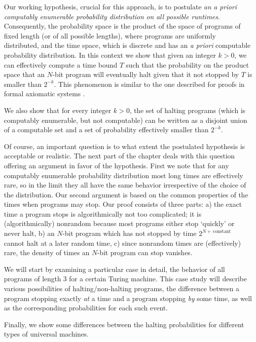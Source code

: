 \documentclass[12pt,twoside,openright]{report}
\begin{document}
Our working hypothesis, crucial for this approach, is to postulate {\it an a priori computably enumerable probability distribution on all possible runtimes}. Consequently, the probability space is the product of the space of programs of fixed length (or of all possible lengths), where programs are uniformly distributed, and the time space, which is discrete and has an {\it a priori} computable probability distribution. In this context we show that given an integer $k>0$, we can effectively compute a time bound $T$ such that  the probability on the product space that an $N$-bit program will eventually halt given that it not stopped by $T$ is smaller than
$2^{-k}$. This phenomenon is similar to the one described for proofs in formal axiomatic systems \cite{CJ}.

We also show that for every integer $k >0$, the set of halting programs (which is computably enumerable, but not computable) can be written as  a disjoint union of a computable set and a set of probability effectively smaller than  $2^{-k}$.

Of course, an important question is to what extent the postulated hypothesis is acceptable or realistic. The next part of the chapter deals with this question offering an argument in favor of the hypothesis.  First we note that for any computably enumerable probability distribution most long times are effectively rare, so in the limit they all have the same behavior irrespective of the choice of the distribution. Our second argument is based on the common properties of the times when programs may stop. Our proof consists of three parts: a) the exact time a program stops is algorithmically not too complicated; it is (algorithmically) nonrandom because most  programs either stop `quickly' or never halt, b) an $N$-bit program which has not stopped by time $2^{N +\, \mbox{constant }}$ cannot halt at a later random time, c) since nonrandom times are (effectively) rare, the density of times an $N$-bit program can stop vanishes.  


We will start by examining a particular case in detail, the behavior of all programs of length 3 for a certain Turing machine.  This case study will describe various possibilities of halting/non-halting programs, the difference between a program stopping exactly {\em at} a time and a program stopping {\em by} some time, as well as the corresponding probabilities for each such event.


Finally, we show some differences between the halting probabilities for different types of universal machines.
\end{document}
